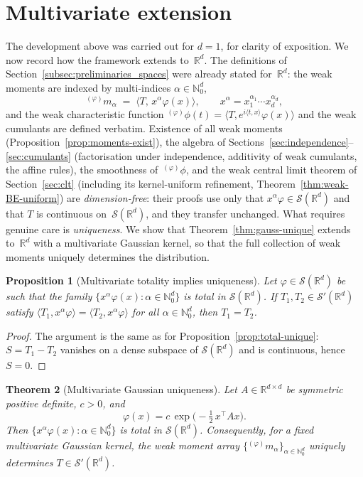 \documentclass[12pt]{article}
\newtheorem{theorem}{Theorem}[section]
\newtheorem{proposition}[theorem]{Proposition}
\theoremstyle{definition}
\newcommand{\R}{\mathbb{R}}
\newcommand{\N}{\mathbb{N}}
\begin{document}
\section{Multivariate extension}
\label{sec:multivariate}

The development above was carried out for $d=1$, for clarity of exposition.
We now record how the framework extends to~$\R^d$.  The definitions of
Section~\ref{subsec:preliminaries_spaces} were already stated for~$\R^d$: the
weak moments are indexed by multi-indices $\alpha\in\N_0^d$,
\[
{}^{(\varphi)}m_\alpha
\;=\;
\langle T,\,x^\alpha\varphi(x)\rangle,
\qquad
x^\alpha = x_1^{\alpha_1}\cdots x_d^{\alpha_d},
\]
and the weak characteristic function
${}^{(\varphi)}\phi(t)=\langle T,e^{i\langle t,x\rangle}\varphi(x)\rangle$
and the weak cumulants are defined verbatim.  Existence of all weak moments
(Proposition~\ref{prop:moments-exist}), the algebra of
Sections~\ref{sec:independence}--\ref{sec:cumulants} (factorisation under
independence, additivity of weak cumulants, the affine rules), the smoothness
of~${}^{(\varphi)}\phi$, and the weak central limit theorem of
Section~\ref{sec:clt} (including its kernel-uniform refinement,
Theorem~\ref{thm:weak-BE-uniform}) are \emph{dimension-free}: their proofs use
only that $x^\alpha\varphi\in\mathcal{S}(\R^d)$ and that $T$ is continuous
on~$\mathcal{S}(\R^d)$, and they transfer unchanged.  What requires genuine
care is \emph{uniqueness}.  We show that Theorem~\ref{thm:gauss-unique} extends
to~$\R^d$ with a multivariate Gaussian kernel, so that the full collection of
weak moments uniquely determines the distribution.

\begin{proposition}[Multivariate totality implies uniqueness]
\label{prop:total-unique-d}
Let $\varphi\in\mathcal{S}(\R^d)$ be such that the family
$\{x^\alpha\varphi(x):\alpha\in\N_0^d\}$ is total in
$\mathcal{S}(\R^d)$.  If
$T_1,T_2\in\mathcal{S}'(\R^d)$ satisfy
$\langle T_1,x^\alpha\varphi\rangle = \langle T_2,x^\alpha\varphi\rangle$
for all $\alpha\in\N_0^d$, then $T_1=T_2$.
\end{proposition}

\begin{proof}
The argument is the same as for Proposition~\ref{prop:total-unique}: $S =
T_1-T_2$ vanishes on a dense subspace of $\mathcal{S}(\R^d)$ and is
continuous, hence $S=0$.
\end{proof}

\begin{theorem}[Multivariate Gaussian uniqueness]
\label{thm:gauss-unique-d}
Let $A\in\R^{d\times d}$ be symmetric positive definite, $c>0$, and
\[
\varphi(x) = c\,\exp\!\bigl(-\tfrac{1}{2}\,x^{\!\top\!}Ax\bigr).
\]
Then $\{x^\alpha\varphi(x):\alpha\in\N_0^d\}$ is total in
$\mathcal{S}(\R^d)$.  Consequently, for a fixed multivariate Gaussian
kernel, the weak moment array
$\{{}^{(\varphi)}m_\alpha\}_{\alpha\in\N_0^d}$ uniquely determines
$T\in\mathcal{S}'(\R^d)$.
\end{theorem}
\end{document}
